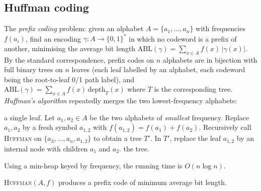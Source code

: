 \subsection{Huffman coding}

The \emph{prefix coding} problem: given an alphabet $A = \{a_1, \dots, a_n\}$ with frequencies $f(a_i)$, find an encoding $\gamma : A \to \{0,1\}^*$ in which no codeword is a prefix of another, minimising the average bit length $\mathrm{ABL}(\gamma) = \sum_{x \in A} f(x)\,|\gamma(x)|$. By the standard correspondence, prefix codes on $n$ alphabets are in bijection with full binary trees on $n$ leaves (each leaf labelled by an alphabet, each codeword being the root-to-leaf 0/1 path label), and $\mathrm{ABL}(\gamma) = \sum_{x \in A} f(x)\,\mathrm{depth}_T(x)$ where $T$ is the corresponding tree. \emph{Huffman's algorithm} repeatedly merges the two lowest-frequency alphabets:

\begin{algorithm}[H]
\caption{\textsc{Huffman}$(A, f)$}
\begin{algorithmic}[1]
 \Return a single leaf.
\EndIf
\State Let $a_1, a_2 \in A$ be the two alphabets of \emph{smallest} frequency.
\State Replace $a_1, a_2$ by a fresh symbol $a_{1,2}$ with $f(a_{1,2}) = f(a_1) + f(a_2)$.
\State Recursively call \textsc{Huffman} on $\{a_3, \dots, a_n, a_{1,2}\}$ to obtain a tree $T'$.
\State In $T'$, replace the leaf $a_{1,2}$ by an internal node with children $a_1$ and $a_2$. \Return the tree.
\end{algorithmic}
\end{algorithm}

Using a min-heap keyed by frequency, the running time is $O(n \log n)$.

\begin{theorem}
\label{thm:huffman}
\textsc{Huffman}$(A, f)$ produces a prefix code of minimum average bit length.
\end{theorem}


